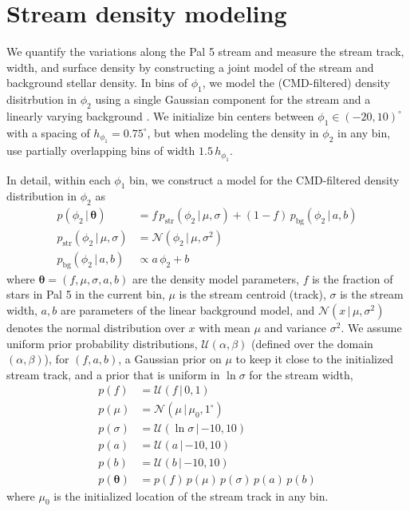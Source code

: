\documentclass[twocolumn]{aastex62}
\newcommand{\bs}[1]{\boldsymbol{#1}}
\newcommand{\given}{\,|\,}
\begin{document}
\section{Stream density modeling}
\label{sec:densitymodel}

We quantify the variations along the Pal 5 stream and measure the stream track, width, and surface density by constructing a joint model of the stream and background stellar density.
In bins of $\phi_1$, we model the (CMD-filtered) density disitrbution in $\phi_2$ using a single Gaussian component for the stream and a linearly varying background \citep[similar to the density modeling described in][]{Price-Whelan:2018}.
We initialize bin centers between $\phi_1 \in (-20, 10)^\circ$ with a spacing of $h_{\phi_1} = 0.75^\circ$, but when modeling the density in $\phi_2$ in any bin, use partially overlapping bins of width $1.5\,h_{\phi_1}$.

In detail, within each $\phi_1$ bin, we construct a model for the CMD-filtered density distribution in $\phi_2$ as
\begin{align}
    p(\phi_2 \given \bs{\theta}) &=
        f \, p_{\textrm{str}}(\phi_2 \given \mu, \sigma) +
        (1-f) \, p_{\textrm{bg}}(\phi_2 \given a, b) \\
    p_{\textrm{str}}(\phi_2 \given \mu, \sigma) &=
        \mathcal{N}(\phi_2 \given \mu, \sigma^2)\\
    p_{\textrm{bg}}(\phi_2 \given a, b) &\propto
        a \, \phi_2 + b
\end{align}
where $\bs{\theta} = (f, \mu, \sigma, a, b)$ are the density model parameters, $f$ is the fraction of stars in Pal 5 in the current bin, $\mu$ is the stream centroid (track), $\sigma$ is the stream width, $a, b$ are parameters of the linear background model, and $\mathcal{N}(x \given \mu, \sigma^2)$ denotes the normal distribution over $x$ with mean $\mu$ and variance $\sigma^2$.
We assume uniform prior probability distributions, $\mathcal{U}(\alpha, \beta)$ (defined over the domain $(\alpha, \beta)$), for $(f, a, b)$, a Gaussian prior on $\mu$ to keep it close to the initialized stream track, and a prior that is uniform in $\ln \sigma$ for the stream width,
\begin{align}
    p(f) &= \mathcal{U}(f \given 0, 1)\\
    p(\mu) &= \mathcal{N}(\mu \given \mu_0, 1^\circ)\\
    p(\sigma) &= \mathcal{U}(\ln\sigma \given {-10}, 10)\\
    p(a) &= \mathcal{U}(a \given {-10}, 10)\\
    p(b) &= \mathcal{U}(b \given {-10}, 10)\\
    p(\bs{\theta}) &= p(f) \, p(\mu) \, p(\sigma) \, p(a) \, p(b)
\end{align}
where $\mu_0$ is the initialized location of the stream track in any bin.
\end{document}
